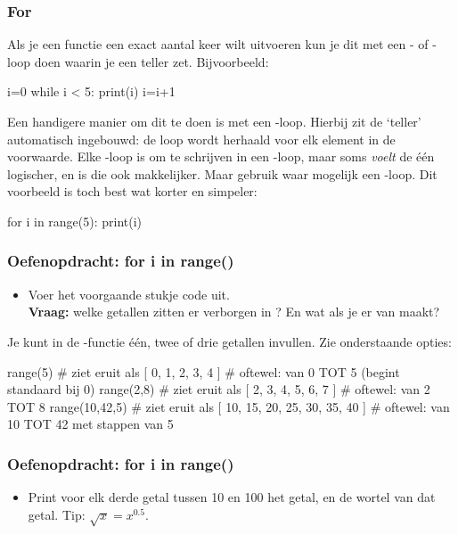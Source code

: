 \documentclass[a4paper,11pt, fleqn]{article}
\begin{document}
\subsubsection{For}
Als je een functie een exact aantal keer wilt uitvoeren kun je dit met een - of -loop doen waarin je een teller zet. Bijvoorbeeld:
\begin{python}
i=0
while i < 5:
    print(i)
    i=i+1
\end{python}
Een handigere manier om dit te doen is met een -loop. Hierbij zit de `teller' automatisch ingebouwd: de loop wordt herhaald voor elk element in de voorwaarde. Elke -loop is om te schrijven in een -loop, maar soms \textit{voelt} de \'e\'en logischer, en is die ook makkelijker. Maar gebruik waar mogelijk een -loop. Dit voorbeeld is toch best wat korter en simpeler:

\begin{python}
for i in range(5):
    print(i)
\end{python}

\subsubsection*{Oefenopdracht: for i in range()}
\begin{itemize}
	\item Voer het voorgaande stukje code uit. \\
	\textbf{Vraag:} welke getallen zitten er verborgen in ? En wat als je er  van maakt?
\end{itemize}

Je kunt in de -functie \'e\'en, twee of drie getallen invullen. Zie onderstaande opties:
\begin{python}
range(5)        # ziet eruit als [ 0, 1, 2, 3, 4 ] 
                # oftewel: van 0 TOT 5 (begint standaard bij 0)
range(2,8)      # ziet eruit als [ 2, 3, 4, 5, 6, 7 ] 
                # oftewel: van 2 TOT 8
range(10,42,5)  # ziet eruit als [ 10, 15, 20, 25, 30, 35, 40 ]
                # oftewel: van 10 TOT 42 met stappen van 5
\end{python}

\subsubsection*{Oefenopdracht: for i in range()}
\begin{itemize}
	\item Print voor elk derde getal tussen 10 en 100 het getal, en de wortel van dat getal. Tip: $\sqrt{x} = x^{0.5}$.
\end{itemize}
\end{document}
